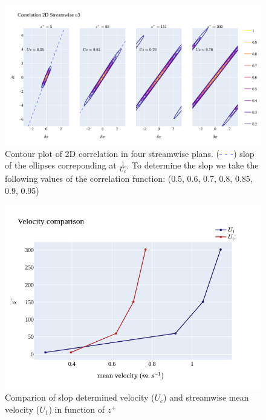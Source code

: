 \documentclass[]{article}
\theoremstyle{plain}
\theoremstyle{remark}
\begin{document}
\begin{figure}[h!]
	\begin{center}
		\includegraphics[width=\textwidth]{../output/channel_wrles_retau395/split_time/frozen_turbulence/correlation2D/u3.png}
		\caption{Contour plot of 2D correlation in four streamwise plans. (\textcolor{blue}{- - -}) slop of the ellipses correponding at $\frac{1}{U_c}$. To determine the slop we take the following values of the correlation function: (0.5, 0.6, 0.7, 0.8, 0.85, 0.9, 0.95)}
	\end{center}
\end{figure}

\begin{figure}[h!]
	\begin{center}
		\includegraphics[width=\textwidth]{../output/channel_wrles_retau395/split_time/frozen_turbulence/correlation2D/u_1c.png}
		\caption{Comparion of slop determined velocity ($U_c$) and streamwise mean velocity ($U_1$) in function of $z^+$}
	\end{center}
\end{figure}
\end{document}
